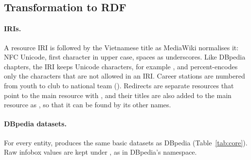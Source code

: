 \subsection{Transformation to RDF}
\label{sec:transform}

\paragraph{IRIs.} A resource IRI is  followed by the Vietnamese
title as MediaWiki normalises it: NFC Unicode, first character in upper case,
spaces as underscores. Like DBpedia chapters, the IRI keeps Unicode characters,
for example , and percent-encodes only the
characters that are not allowed in an IRI. Career stations are numbered from
youth to club to national team ().
Redirects are separate resources that point to the main resource with
, and their titles are also added to the main
resource as , so that it can be found by its other names.

\paragraph{DBpedia datasets.} For every entity,  produces the
same basic datasets as DBpedia (Table~\ref{tab:core}). Raw infobox
values are kept under , as in DBpedia's  namespace.

